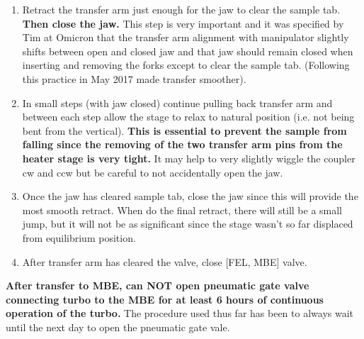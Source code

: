 \begin{enumerate}
	\item Retract the transfer arm just enough for the jaw to clear the sample tab. \textbf{Then close the jaw.} This step is very important and it was specified by Tim at Omicron that the transfer arm alignment with manipulator slightly shifts between open and closed jaw and that jaw should remain closed when inserting and removing the forks except to clear the sample tab. (Following this practice in May 2017 made transfer smoother). 
	\item In small steps (with jaw closed) continue pulling back transfer arm and between each step allow the stage to relax to natural position (i.e. not being bent from the vertical). \textbf {This is essential to prevent the sample from falling since the removing of the two transfer arm pins from the heater stage is very tight.} It may help to very slightly wiggle the coupler cw and ccw but be careful to not accidentally open the jaw.
	\item Once the jaw has cleared sample tab, close the jaw since this will provide the most smooth retract. When do the final retract, there will still be a small jump, but it will not be as significant since the stage wasn't so far displaced from equilibrium position.	
	\item After transfer arm has cleared the valve, close [FEL, MBE] valve.
\end{enumerate}
\textbf{After transfer to MBE, can NOT open pneumatic gate valve connecting turbo to the  MBE for at least 6 hours of continuous operation of the turbo.} The procedure used thus far has been to always wait until the next day to open the pneumatic gate vale.

